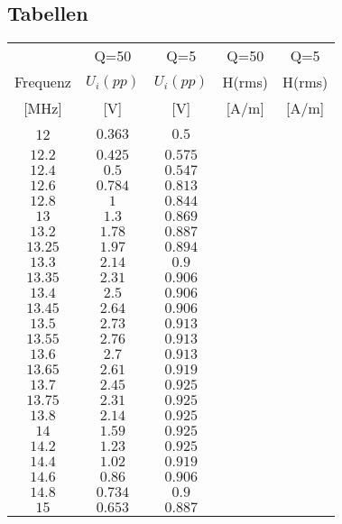 \documentclass[12pt,a4paper,ngerman]{article}
\begin{document}
\subsection{Tabellen}
\centering
\begin{tabular}{ |c|c|c|c|c| }
  \hline
     & Q=50 & Q=5 & Q=50 & Q=5\\

    Frequenz & $U_i(pp)$ & $U_i(pp)$ & H(rms) & H(rms)\\

  [MHz] & [V] & [V] & [A/m] & [A/m] \\
  \hline
  12 & $0.363$ & $0.5$ & & \\
  \hline
  $12.2$ & $0.425$ & $0.575$ & & \\
  \hline
  $12.4$ & $0.5$ & $0.547$ & & \\
  \hline
  $12.6$ & $0.784$ & $0.813$ & & \\
    \hline
  $12.8$ & $1$ & $0.844$ & & \\
    \hline
  $13$ & $1.3$ & $0.869$ & & \\
    \hline
  $13.2$ & $1.78$ & $0.887$ & & \\
     \hline
  $13.25$ & $1.97$ & $0.894$ & & \\ 
    \hline
  $13.3$ & $2.14$ & $0.9$ & & \\
    \hline
  $13.35$ & $2.31$ & $0.906$ & & \\
    \hline
  $13.4$ & $2.5$ & $0.906$ & & \\
    \hline
  $13.45$ & $2.64$ & $0.906$ & & \\
    \hline
  $13.5$ & $2.73$ & $0.913$ & & \\
     \hline
  $13.55$ & $2.76$ & $0.913$ & & \\
      \hline
  $13.6$ & $2.7$ & $0.913$ & & \\ 
      \hline
  $13.65$ & $2.61$ & $0.919$ & & \\
      \hline
  $13.7$ & $2.45$ & $0.925$ & & \\
      \hline
  $13.75$ & $2.31$ & $0.925$ & & \\
      \hline
  $13.8$ & $2.14$ & $0.925$ & & \\
      \hline
  $14$ & $1.59$ & $0.925$ & & \\
      \hline
  $14.2$ & $1.23$ & $0.925$ & & \\
      \hline
  $14.4$ & $1.02$ & $0.919$ & & \\
      \hline
  $14.6$ & $0.86$ & $0.906$ & & \\
      \hline
  $14.8$ & $0.734$ & $0.9$ & & \\
      \hline
  $15$ & $0.653$ & $0.887$ & & \\
      \hline
  \hline
 
\end{tabular}
\end{document}
